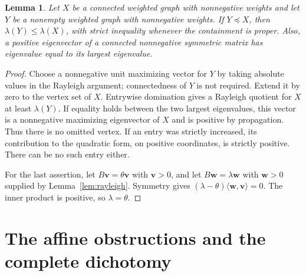 \documentclass[11pt]{amsart}
\newcommand\Zv{{\mathbf v}}
\newcommand\Zw{{\mathbf w}}
\newcommand\ip[2]{\langle#1,#2\rangle}
\newtheorem{lemma}[theorem]{Lemma}
\theoremstyle{definition}
\begin{document}
\begin{lemma}\label{lem:monotonicity}
\textup{\cite[Theorem 3.1.1 and Proposition 3.2.4]{BCN}}
Let $X$ be a connected weighted graph with nonnegative weights and let $Y$
be a nonempty weighted graph with nonnegative weights. If
$Y\preccurlyeq X$, then $\lambda(Y)\leq\lambda(X)$, with strict inequality
whenever the containment is proper. Also, a positive eigenvector of a
connected nonnegative symmetric matrix has eigenvalue equal to its largest
eigenvalue.
\end{lemma}
\begin{proof}
Choose a nonnegative unit maximizing vector for $Y$ by taking absolute
values in the Rayleigh argument; connectedness of $Y$ is not required.
Extend it by zero to the vertex set of $X$. Entrywise domination gives a
Rayleigh quotient for $X$ at least $\lambda(Y)$.
If equality holds between the two largest eigenvalues, this vector is a
nonnegative maximizing eigenvector of $X$ and is positive by propagation.
Thus there is no omitted vertex. If an entry was strictly
increased, its contribution to the quadratic form, on positive coordinates,
is strictly positive. There can be no such entry either.

For the last assertion, let $B\Zv=\theta\Zv$ with $\Zv>0$, and let
$B\Zw=\lambda\Zw$ with $\Zw>0$ supplied by Lemma~\ref{lem:rayleigh}.
Symmetry gives $(\lambda-\theta)\ip{\Zw}{\Zv}=0$. The inner product is
positive, so $\lambda=\theta$.
\end{proof}

\section{The affine obstructions and the complete dichotomy}\label{sec:dichotomy}
\end{document}
